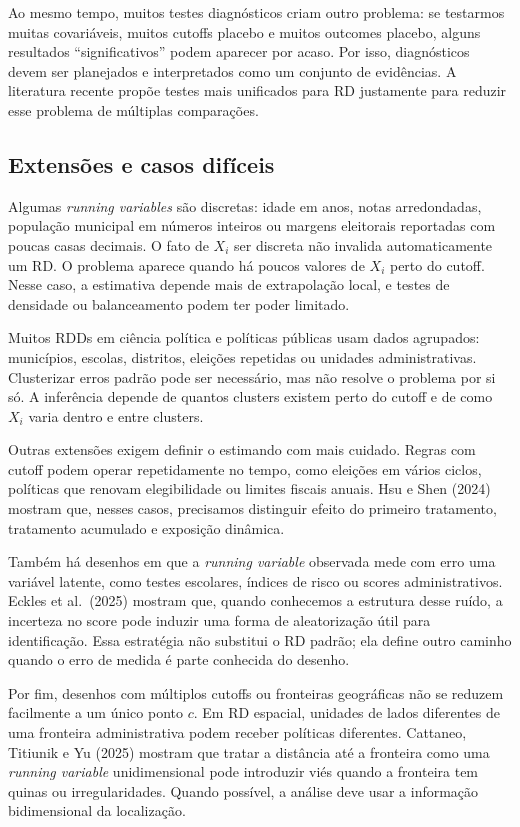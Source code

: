 \documentclass[
]{article}
\begin{document}
Ao mesmo tempo, muitos testes diagnósticos criam outro problema: se testarmos muitas covariáveis, muitos cutoffs placebo e muitos outcomes placebo, alguns resultados ``significativos'' podem aparecer por acaso. Por isso, diagnósticos devem ser planejados e interpretados como um conjunto de evidências. A literatura recente propõe testes mais unificados para RD justamente para reduzir esse problema de múltiplas comparações.

\subsection{Extensões e casos difíceis}\label{extensuxf5es-e-casos-difuxedceis}

Algumas \emph{running variables} são discretas: idade em anos, notas arredondadas, população municipal em números inteiros ou margens eleitorais reportadas com poucas casas decimais. O fato de \(X_i\) ser discreta não invalida automaticamente um RD. O problema aparece quando há poucos valores de \(X_i\) perto do cutoff. Nesse caso, a estimativa depende mais de extrapolação local, e testes de densidade ou balanceamento podem ter poder limitado.

Muitos RDDs em ciência política e políticas públicas usam dados agrupados: municípios, escolas, distritos, eleições repetidas ou unidades administrativas. Clusterizar erros padrão pode ser necessário, mas não resolve o problema por si só. A inferência depende de quantos clusters existem perto do cutoff e de como \(X_i\) varia dentro e entre clusters.

Outras extensões exigem definir o estimando com mais cuidado. Regras com cutoff podem operar repetidamente no tempo, como eleições em vários ciclos, políticas que renovam elegibilidade ou limites fiscais anuais. Hsu e Shen (2024) mostram que, nesses casos, precisamos distinguir efeito do primeiro tratamento, tratamento acumulado e exposição dinâmica.

Também há desenhos em que a \emph{running variable} observada mede com erro uma variável latente, como testes escolares, índices de risco ou scores administrativos. Eckles et al.~(2025) mostram que, quando conhecemos a estrutura desse ruído, a incerteza no score pode induzir uma forma de aleatorização útil para identificação. Essa estratégia não substitui o RD padrão; ela define outro caminho quando o erro de medida é parte conhecida do desenho.

Por fim, desenhos com múltiplos cutoffs ou fronteiras geográficas não se reduzem facilmente a um único ponto \(c\). Em RD espacial, unidades de lados diferentes de uma fronteira administrativa podem receber políticas diferentes. Cattaneo, Titiunik e Yu (2025) mostram que tratar a distância até a fronteira como uma \emph{running variable} unidimensional pode introduzir viés quando a fronteira tem quinas ou irregularidades. Quando possível, a análise deve usar a informação bidimensional da localização.
\end{document}

